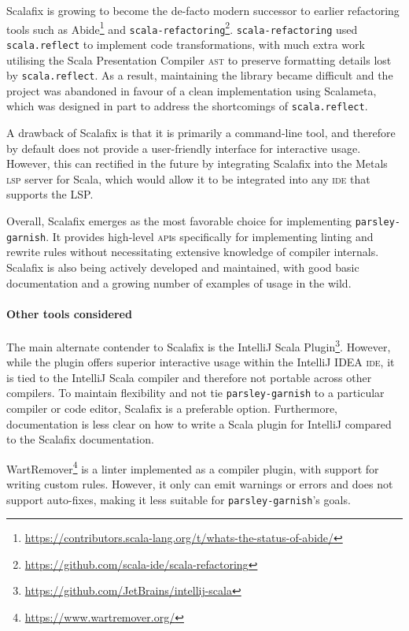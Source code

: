 Scalafix is growing to become the de-facto modern successor to earlier refactoring tools such as Abide\footnote{\url{https://contributors.scala-lang.org/t/whats-the-status-of-abide/}} and \texttt{scala-refactoring}\footnote{\url{https://github.com/scala-ide/scala-refactoring}}.
\texttt{scala-refactoring} used \texttt{scala.reflect} to implement code transformations, with much extra work utilising the Scala Presentation Compiler \textsc{ast} to preserve formatting details lost by \texttt{scala.reflect}.
As a result, maintaining the library became difficult and the project was abandoned in favour of a clean implementation using Scalameta, which was designed in part to address the shortcomings of \texttt{scala.reflect}.

A drawback of Scalafix is that it is primarily a command-line tool, and therefore by default does not provide a user-friendly interface for interactive usage.
However, this can rectified in the future by integrating Scalafix into the Metals \textsc{lsp} server for Scala, which would allow it to be integrated into any \textsc{ide} that supports the LSP.

Overall, Scalafix emerges as the most favorable choice for implementing \texttt{parsley-garnish}.
It provides high-level \textsc{api}s specifically for implementing linting and rewrite rules without necessitating extensive knowledge of compiler internals.
Scalafix is also being actively developed and maintained, with good basic documentation and a growing number of examples of usage in the wild.

\paragraph{Other tools considered}
The main alternate contender to Scalafix is the IntelliJ Scala Plugin\footnote{\url{https://github.com/JetBrains/intellij-scala}}.
However, while the plugin offers superior interactive usage within the IntelliJ IDEA \textsc{ide}, it is tied to the IntelliJ Scala compiler and therefore not portable across other compilers.
To maintain flexibility and not tie \texttt{parsley-garnish} to a particular compiler or code editor, Scalafix is a preferable option.
Furthermore, documentation is less clear on how to write a Scala plugin for IntelliJ compared to the Scalafix documentation.

WartRemover\footnote{\url{https://www.wartremover.org/}} is a linter implemented as a compiler plugin, with support for writing custom rules.
However, it only can emit warnings or errors and does not support auto-fixes, making it less suitable for \texttt{parsley-garnish}'s goals.

